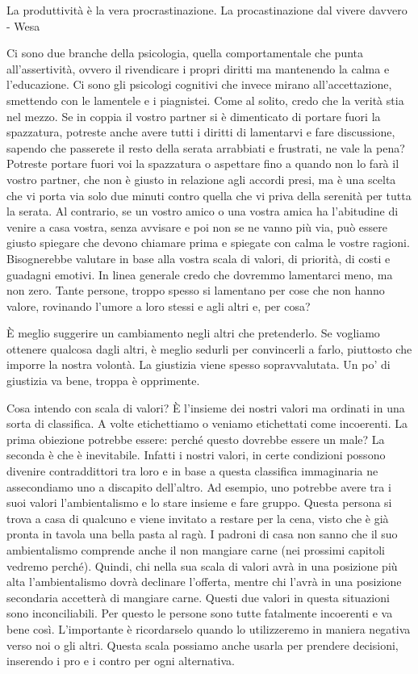 \documentclass[12pt]{book} %
\begin{document}
La produttività è la vera procrastinazione. La procastinazione dal vivere davvero - Wesa 

Ci sono due branche della psicologia, quella comportamentale che punta all'assertività, ovvero il
rivendicare i propri diritti ma mantenendo la calma e l'educazione. Ci sono gli psicologi
cognitivi che invece mirano all'accettazione, smettendo con le lamentele e i piagnistei. Come al
solito, credo che la verità stia nel mezzo. Se in coppia il vostro partner si è dimenticato di portare fuori la
spazzatura, potreste anche avere tutti i diritti di lamentarvi e fare discussione, sapendo che passerete il resto della
serata arrabbiati e frustrati, ne vale la pena? Potreste portare fuori voi la spazzatura o aspettare fino a quando non
lo farà il vostro partner, che non è giusto in relazione agli accordi presi, ma è una scelta che vi porta via solo due
minuti contro quella che vi priva della serenità per tutta la serata. Al contrario, se un vostro amico o una vostra
amica ha l'abitudine di venire a casa vostra, senza avvisare e poi non se ne vanno più via, può
essere giusto spiegare che devono chiamare prima e spiegate con calma le vostre ragioni. Bisognerebbe valutare in base
alla vostra scala di valori, di priorità, di costi e guadagni emotivi. In linea generale credo che dovremmo lamentarci
meno, ma non zero. Tante persone, troppo spesso si lamentano per cose che non hanno valore, rovinando
l'umore a loro stessi e agli altri e, per cosa?

È meglio suggerire un cambiamento negli altri che pretenderlo. Se vogliamo ottenere qualcosa dagli altri, è meglio
sedurli per convincerli a farlo, piuttosto che imporre la nostra volontà. La giustizia viene spesso sopravvalutata. Un
po' di giustizia va bene, troppa è opprimente.


\bigskip

Cosa intendo con scala di valori? È l'insieme dei nostri valori ma ordinati in una sorta di
classifica. A volte etichettiamo o veniamo etichettati come incoerenti. La prima obiezione potrebbe essere: perché
questo dovrebbe essere un male? La seconda è che è inevitabile. Infatti i nostri valori, in certe condizioni possono
divenire contraddittori tra loro e in base a questa classifica immaginaria ne assecondiamo uno a discapito
dell'altro. Ad esempio, uno potrebbe avere tra i suoi valori l'ambientalismo
e lo stare insieme e fare gruppo. Questa persona si trova a casa di qualcuno e viene invitato a restare per la cena,
visto che è già pronta in tavola una bella pasta al ragù. I padroni di casa non sanno che il suo ambientalismo
comprende anche il non mangiare carne (nei prossimi capitoli vedremo perché). Quindi, chi nella sua scala di valori
avrà in una posizione più alta l'ambientalismo dovrà declinare l'offerta,
mentre chi l'avrà in una posizione secondaria accetterà di mangiare carne. Questi due valori in
questa situazioni sono inconciliabili. Per questo le persone sono tutte fatalmente incoerenti e va bene così.
L'importante è ricordarselo quando lo utilizzeremo in maniera negativa verso noi o gli altri.
Questa scala possiamo anche usarla per prendere decisioni, inserendo i pro e i contro per ogni alternativa.
\end{document}
